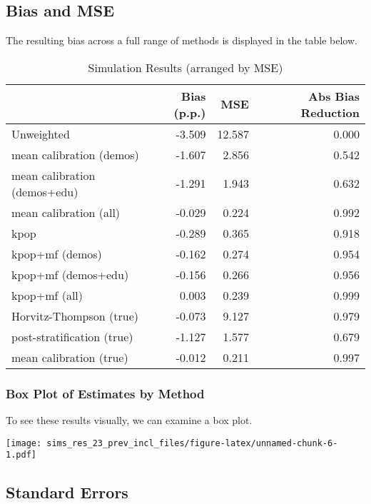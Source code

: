 \documentclass[
]{article}
\begin{document}
\hypertarget{bias-and-mse}{%
\subsection{Bias and MSE}\label{bias-and-mse}}

The resulting bias across a full range of methods is displayed in the
table below.

\begin{table}[!h]

\caption{\label{tab:non_lin_res_race_r55_inter}Simulation Results (arranged by MSE)}
\centering
\begin{tabular}[t]{lrrr}
\toprule
  & Bias (p.p.) & MSE & Abs Bias Reduction\\
\midrule
Unweighted & -3.509 & 12.587 & 0.000\\
mean calibration (demos) & -1.607 & 2.856 & 0.542\\
mean calibration (demos+edu) & -1.291 & 1.943 & 0.632\\
mean calibration (all) & -0.029 & 0.224 & 0.992\\
kpop & -0.289 & 0.365 & 0.918\\
\addlinespace
kpop+mf (demos) & -0.162 & 0.274 & 0.954\\
kpop+mf (demos+edu) & -0.156 & 0.266 & 0.956\\
kpop+mf (all) & 0.003 & 0.239 & 0.999\\
Horvitz-Thompson (true) & -0.073 & 9.127 & 0.979\\
post-stratification (true) & -1.127 & 1.577 & 0.679\\
\addlinespace
mean calibration (true) & -0.012 & 0.211 & 0.997\\
\bottomrule
\end{tabular}
\end{table}

\hypertarget{box-plot-of-estimates-by-method}{%
\subsubsection{Box Plot of Estimates by
Method}\label{box-plot-of-estimates-by-method}}

To see these results visually, we can examine a box plot.

\texttt{[image: sims\_res\_23\_prev\_incl\_files/figure-latex/unnamed-chunk-6-1.pdf]}

\hypertarget{standard-errors}{%
\subsection{\texorpdfstring{Standard Errors
\label{sims:SEs}}{Standard Errors }}\label{standard-errors}}
\end{document}
